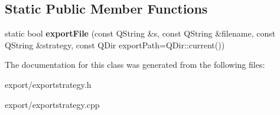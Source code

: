 \subsection*{Static Public Member Functions}
\begin{DoxyCompactItemize}
\item 
\hypertarget{class_export_strategy_a8af6c3f0b467544e6860b69e36f27379}{static bool {\bfseries export\-File} (const Q\-String \&s, const Q\-String \&filename, const Q\-String \&strategy, const Q\-Dir export\-Path=Q\-Dir\-::current())}\label{class_export_strategy_a8af6c3f0b467544e6860b69e36f27379}

\end{DoxyCompactItemize}


The documentation for this class was generated from the following files\-:\begin{DoxyCompactItemize}
\item 
export/exportstrategy.\-h\item 
export/exportstrategy.\-cpp\end{DoxyCompactItemize}
